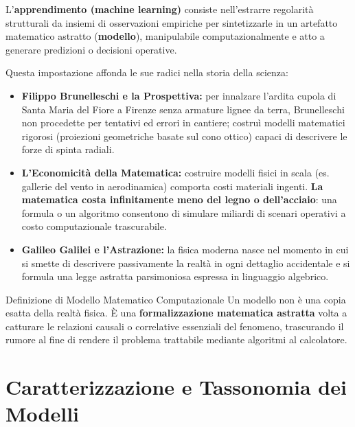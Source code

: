 \begin{definition}
L'\textbf{apprendimento (machine learning)} consiste nell'estrarre regolarit\`a strutturali da insiemi di osservazioni empiriche per sintetizzarle in un artefatto matematico astratto (\textbf{modello}), manipulabile computazionalmente e atto a generare predizioni o decisioni operative.
\end{definition}

Questa impostazione affonda le sue radici nella storia della scienza:
\begin{itemize}
    \item \textbf{Filippo Brunelleschi e la Prospettiva:} per innalzare l'ardita cupola di Santa Maria del Fiore a Firenze senza armature lignee da terra, Brunelleschi non procedette per tentativi ed errori in cantiere; costru\`i modelli matematici rigorosi (proiezioni geometriche basate sul cono ottico) capaci di descrivere le forze di spinta radiali.
    \item \textbf{L'Economicit\`a della Matematica:} costruire modelli fisici in scala (es. gallerie del vento in aerodinamica) comporta costi materiali ingenti. \textbf{La matematica costa infinitamente meno del legno o dell'acciaio}: una formula o un algoritmo consentono di simulare miliardi di scenari operativi a costo computazionale trascurabile.
    \item \textbf{Galileo Galilei e l'Astrazione:} la fisica moderna nasce nel momento in cui si smette di descrivere passivamente la realt\`a in ogni dettaglio accidentale e si formula una legge astratta parsimoniosa espressa in linguaggio algebrico.
\end{itemize}

\begin{noteblock}{Definizione di Modello Matematico Computazionale}
Un modello non \`e una copia esatta della realt\`a fisica. \`E una \textbf{formalizzazione matematica astratta} volta a catturare le relazioni causali o correlative essenziali del fenomeno, trascurando il rumore al fine di rendere il problema trattabile mediante algoritmi al calcolatore.
\end{noteblock}

\FloatBarrier
\section{Caratterizzazione e Tassonomia dei Modelli}

